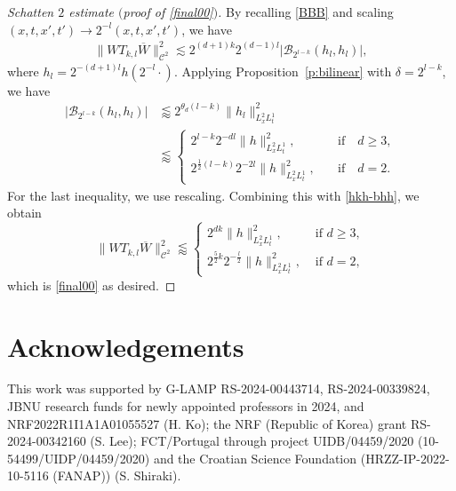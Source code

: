 \documentclass[a4paper]{amsart}
\numberwithin{figure}{section}
\numberwithin{equation}{section}%
\theoremstyle{plain}%
\theoremstyle{definition}
\theoremstyle{remark}%
\def\C{\mathcal{C}}
\begin{document}
\begin{proof}[Schatten $2$ estimate $($proof of \eqref{final00}$)$]
By recalling 
\eqref{BBB}  and scaling  $(x,t, x',t')\to 2^{-l}(x,t, x',t')$, we have 
\begin{align}\label{hkh-bhh}
    \|WT_{k,l}\overline{W}\|_{\C^2}^2
    \lesssim 
   2^{(d+1)k} 2^{(d-1) l}    
   \big| \mathcal B_{2^{l-k}}(h_{l},h_{l})\big|,
\end{align}
 where  $h_l=2^{-(d+1)l}h(2^{-l}\cdot)$.   Applying Proposition~\ref{p:bilinear}  with $\delta=2^{l-k}$, 
 we have 
 \begin{align*} 
 \big| \mathcal B_{2^{l-k}}(h_{l},h_{l})\big|
 &\lessapprox 2^{\theta_d(l-k)}\|h_{l}\|_{L_x^2L_t^1}^2 
 \\ 
 &\lessapprox
 \begin{cases}
 2^{l-k} 2^{-dl}
 \|h\|_{L_x^2L_t^1}^2, \quad &\text{if} \quad d\ge3,\\[1ex]
 2^{\frac12(l-k)}2^{-2l}
  \|h\|_{L_x^2L_t^1}^2, \quad &\text{if} \quad d=2.
 \end{cases}
 \end{align*}
For the last inequality, we use rescaling. 
Combining this with \eqref{hkh-bhh}, we obtain
\[
    \|WT_{k,l}\overline{W}\|_{\C^2}^2
\lessapprox
\begin{cases}
2^{dk} \|h\|_{L_x^2L_t^1}^2,  &\text{ if }  d\ge3,\\[1ex]
2^{\frac 52k}2^{-\frac l2} \|h\|_{L_x^2L_t^1}^2,  &\text{ if }  d=2,
\end{cases}
\]
which is \eqref{final00} as desired.
\end{proof}







\section*{Acknowledgements} 
This work was supported by G-LAMP RS-2024-00443714, RS-2024-00339824, JBNU research funds for newly appointed professors in 2024, and NRF2022R1I1A1\-A01055527 (H. Ko);  the NRF (Republic of Korea) grant  RS-2024-00342160 (S. Lee);  FCT/Portugal through project UIDB/04459/2020 (10-54499/UIDP/04459/2020) and the Croatian Science Foundation (HRZZ-IP-2022-10-5116 (FANAP)) (S. Shiraki). 




  
\end{document}
